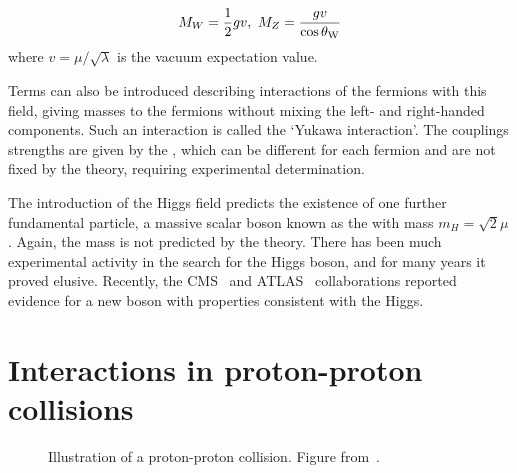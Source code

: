 \begin{equation}
M_{W} = \frac{1}{2}gv, \ M_{Z} = \frac{gv}{\cos{\ensuremath{\theta_{\mathrm{W}}}}}
\end{equation}
where $v = \mu / \sqrt{\lambda}$ is the vacuum expectation value. 

Terms can also be
introduced describing interactions of the fermions with this field, giving
masses to the fermions without mixing the left- and right-handed components.
Such an interaction is called the `Yukawa interaction'. The couplings strengths
are given by the , which can be different for each
fermion and are not fixed by the theory, requiring experimental determination. 

The introduction of the Higgs field predicts the existence of one further
fundamental particle, a massive scalar boson known as the 
with mass $m_{H} = \sqrt{2}\mu$. Again, the mass is not predicted by the theory. 
There has
been much experimental activity in the search for the Higgs boson, and for many
years it proved elusive. Recently,
the CMS~\cite{CMS_Higgs:2012gu} and ATLAS~\cite{ATLAS_Higgs:2012gk} collaborations reported evidence for a new boson with
properties consistent with the Higgs.

\section{Interactions in proton-proton collisions}
\label{sec:Theory-ppInteractions}

\begin{figure}
\centering
        \vspace{-5mm}
    \caption[Illustration of a proton-proton collision.] {\small
Illustration of a proton-proton collision. Figure from~\cite{Campbell:2006wx}.
}
    \label{fig:pp-event}
\end{figure}

